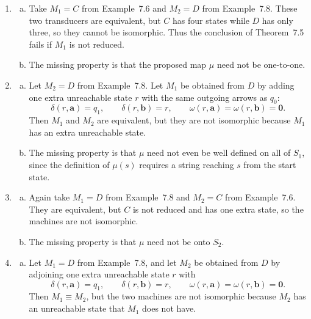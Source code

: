 \begin{enumerate}[{7.}1.]
\item \begin{enumerate}[(a)]
  \item Take $M_1=C$ from Example~7.6 and $M_2=D$ from Example~7.8.  These two
  transducers are equivalent, but $C$ has four states while $D$ has only three,
  so they cannot be isomorphic.  Thus the conclusion of Theorem~7.5 fails if
  $M_1$ is not reduced.

  \item The missing property is that the proposed map $\mu$ need not be
  one-to-one.
\end{enumerate}

\item \begin{enumerate}[(a)]
  \item Let $M_2=D$ from Example~7.8.  Let $M_1$ be obtained from $D$ by adding
  one extra unreachable state $r$ with the same outgoing arrows as $q_0$:
  \[
    \delta(r,\pmb{a})=q_1,\qquad \delta(r,\pmb{b})=r,\qquad
    \omega(r,\pmb{a})=\omega(r,\pmb{b})=\pmb{0}.
  \]
  Then $M_1$ and $M_2$ are equivalent, but they are not isomorphic because
  $M_1$ has an extra unreachable state.

  \item The missing property is that $\mu$ need not even be well defined on all
  of $S_1$, since the definition of $\mu(s)$ requires a string reaching $s$ from
  the start state.
\end{enumerate}

\item \begin{enumerate}[(a)]
  \item Again take $M_1=D$ from Example~7.8 and $M_2=C$ from Example~7.6.
  They are equivalent, but $C$ is not reduced and has one extra state, so the
  machines are not isomorphic.

  \item The missing property is that $\mu$ need not be onto $S_2$.
\end{enumerate}

\item \begin{enumerate}[(a)]
  \item Let $M_1=D$ from Example~7.8, and let $M_2$ be obtained from $D$ by
  adjoining one extra unreachable state $r$ with
  \[
    \delta(r,\pmb{a})=q_1,\qquad \delta(r,\pmb{b})=r,\qquad
    \omega(r,\pmb{a})=\omega(r,\pmb{b})=\pmb{0}.
  \]
  Then $M_1\equiv M_2$, but the two machines are not isomorphic because $M_2$
  has an unreachable state that $M_1$ does not have.


\end{enumerate}
\end{enumerate}
